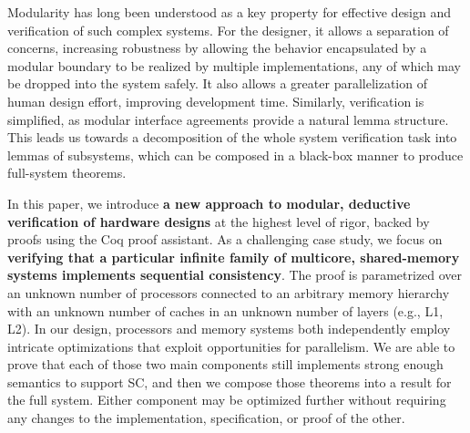 Modularity has long been understood as a key property for effective design and
verification of such complex systems. For the designer, it allows a separation
of concerns, increasing robustness by allowing the behavior encapsulated by a
modular boundary to be realized by multiple implementations, any of which may be
dropped into the system safely. It also allows a greater
parallelization of human design effort, improving development time. Similarly, verification is
simplified, as modular interface agreements provide a natural lemma structure.
This leads us towards a decomposition of the whole system verification
task into lemmas of subsystems, which can be composed in a black-box manner to
produce full-system theorems.



In this paper, we introduce \textbf{a new approach to modular,
  deductive verification of hardware designs} at the highest level of
rigor, backed by proofs using the Coq proof assistant.  As a
challenging case study, we focus on \textbf{verifying that a
  particular infinite family of multicore, shared-memory systems
  implements sequential consistency}.  The proof is parametrized over
an unknown number of processors connected to an arbitrary memory
hierarchy with an unknown number of caches in an unknown number of
layers (e.g., L1, L2).  In our design, processors and memory systems
both independently employ intricate optimizations that exploit
opportunities for parallelism.  We are able to prove that each of
those two main components still implements strong enough semantics to
support SC, and then we compose those theorems into a result for the
full system.  Either component may be optimized further without
requiring any changes to the implementation, specification, or proof
of the other.

